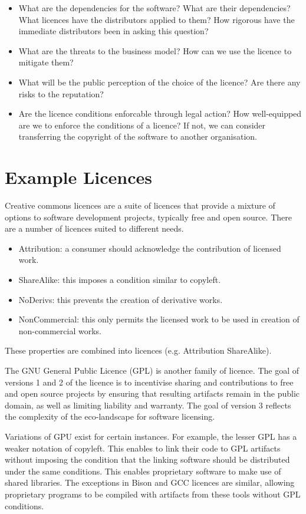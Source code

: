 \documentclass[a4paper, openany]{memoir}
\begin{document}
\begin{itemize}
    \item What are the dependencies for the software? What are their dependencies? What licences have the distributors applied to them? How rigorous have the immediate distributors been in asking this question?
    \item What are the threats to the business model? How can we use the licence to mitigate them?
    \item What will be the public perception of the choice of the licence? Are there any risks to the reputation?
    \item Are the licence conditions enforcable through legal action? How well-equipped are we to enforce the conditions of a licence? If not, we can consider transferring the copyright of the software to another organisation.
\end{itemize}

\section{Example Licences}
Creative commons licences are a suite of licences that provide a mixture of options to software development projects, typically free and open source. There are a number of licences suited to different needs.
\begin{itemize}
    \item Attribution: a consumer should acknowledge the contribution of licensed work.
    \item ShareAlike: this imposes a condition similar to copyleft.
    \item NoDerivs: this prevents the creation of derivative works.
    \item NonCommercial: this only permits the licensed work to be used in creation of non-commercial works.
\end{itemize}
These properties are combined into licences (e.g. Attribution ShareAlike).

The GNU General Public Licence (GPL) is another family of licence. The goal of versions 1 and 2 of the licence is to incentivise sharing and contributions to free and open source projects by ensuring that resulting artifacts remain in the public domain, as well as limiting liability and warranty. The goal of version 3 reflects the complexity of the eco-landscape for software licensing. 

Variations of GPU exist for certain instances. For example, the lesser GPL has a weaker notation of copyleft. This enables to link their code to GPL artifacts without imposing the condition that the linking software should be distributed under the same conditions. This enables proprietary software to make use of shared libraries. The exceptions in Bison and GCC licences are similar, allowing proprietary programs to be compiled with artifacts from these tools without GPL conditions.
\end{document}
